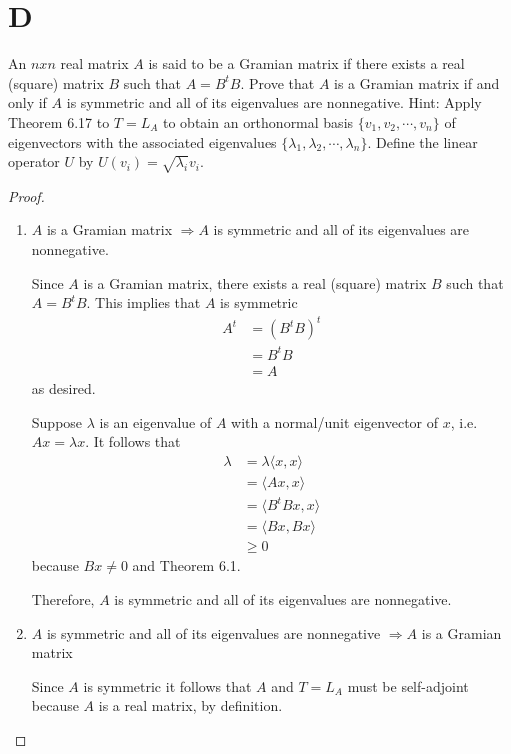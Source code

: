 \documentclass[11pt]{scrartcl}
\begin{document}
\section{D}
An $nxn$ real matrix $A$ is said to be a Gramian matrix if there exists a real (square) matrix $B$ such that $A = B^t B$.
Prove that $A$ is a Gramian matrix if and only if $A$ is symmetric and all of its eigenvalues are nonnegative. Hint:
Apply Theorem 6.17 to $T =L_A$ to obtain an orthonormal basis $\{v_1, v_2, \cdots, v_n\}$ of eigenvectors with the associated
eigenvalues $\{\lambda_1, \lambda_2, \cdots, \lambda_n\}$. Define the linear operator $U$ by $U(v_i) = \sqrt{\lambda_i}v_i$.
\begin{proof}\
	\begin{enumerate}[label=\roman*.]
		\item {
		      $A$ is a Gramian matrix $\Rightarrow A$ is symmetric and all of its eigenvalues are nonnegative.\par
		      Since $A$ is a Gramian matrix, there exists a real (square) matrix $B$ such that $A = B^t B$.
		      This implies that $A$ is symmetric
		      \begin{align*}
			      A^t & = (B^t B)^t \\
			          & = B^t B     \\
			          & = A
		      \end{align*}
		      as desired.\par
		      Suppose $\lambda$ is an eigenvalue of $A$ with a normal/unit eigenvector of $x$, i.e. $Ax = \lambda x$.
		      It follows that
		      \begin{align*}
			      \lambda & = \lambda \langle x,x \rangle \\
			              & = \langle Ax,x \rangle        \\
			              & = \langle B^t B x,x \rangle   \\
			              & = \langle Bx, Bx \rangle      \\
			              & \geq 0
		      \end{align*}
		      because $Bx \neq 0$ and Theorem 6.1.\par
		      Therefore, $A$ is symmetric and all of its eigenvalues are nonnegative.
		      }
		\item{
		      $A$ is symmetric and all of its eigenvalues are nonnegative $\Rightarrow A$ is a Gramian matrix\par
		      Since $A$ is symmetric it follows that $A$ and $T = L_A$ must be self-adjoint because $A$ is a real matrix, by definition.
}
\end{enumerate}
\end{proof}
\end{document}
